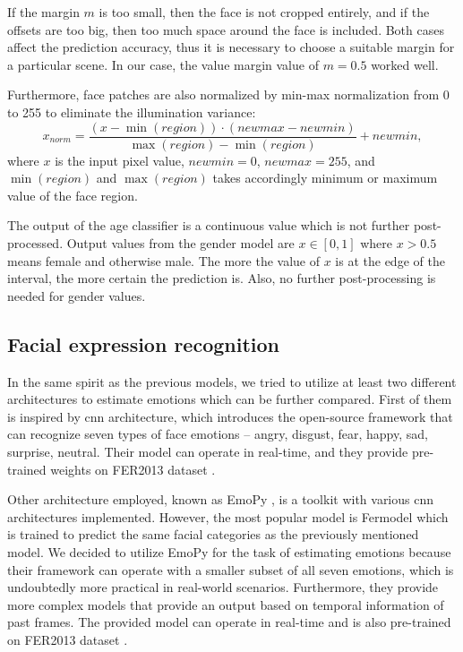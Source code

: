             If the margin $m$ is too small, then the face is not cropped entirely, and if the offsets are too big, then too much space around the face is included. Both cases affect the prediction accuracy, thus it is necessary to choose a suitable margin for a particular scene. In our case, the value margin value of $m=0.5$ worked well.
            
            Furthermore, face patches are also normalized by min-max normalization from 0 to 255 to eliminate the illumination variance:
            \begin{equation}
                    x_{norm} = \frac{( x - \min(region) ) \cdot (newmax - newmin)}{\max(region) - \min(region)} + newmin,
            \end{equation}
            where $x$ is the input pixel value, $newmin=0$, $newmax=255$, and $\min(region)$ and $\max(region)$ takes accordingly minimum or maximum value of the face region. 
            
           The output of the age classifier is a continuous value which is not further post-processed. Output values from the gender model are $x \in [0,1]$ where $x > 0.5$ means female and otherwise male. The more the value of $x$ is at the edge of the interval, the more certain the prediction is. Also, no further post-processing is needed for gender values.

        \subsection{Facial expression recognition}
            In the same spirit as the previous models, we tried to utilize at least two different architectures to estimate emotions which can be further compared. First of them is \cite{arriaga2017real} inspired by \cite{rothe2015dex} \gls{cnn} architecture, which introduces the open-source framework that can recognize seven types of face emotions -- angry, disgust, fear, happy, sad, surprise, neutral. Their model can operate in real-time, and they provide pre-trained weights on FER2013 dataset \cite{goodfellow2013challenges}. 

            Other architecture employed, known as EmoPy \cite{emopy}, is a toolkit with various \gls{cnn} architectures implemented. However, the most popular model is Fermodel which is trained to predict the same facial categories as the previously mentioned model. We decided to utilize EmoPy for the task of estimating emotions because their framework can operate with a smaller subset of all seven emotions, which is undoubtedly more practical in real-world scenarios. Furthermore, they provide more complex models that provide an output based on temporal information of past frames. The provided model can operate in real-time and is also pre-trained on FER2013 dataset \cite{goodfellow2013challenges}.
            
